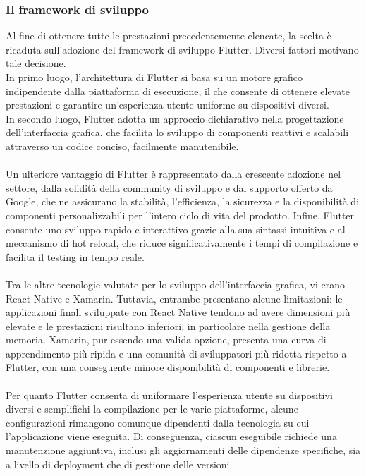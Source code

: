 \subsubsection{Il framework di sviluppo}
Al fine di ottenere tutte le prestazioni precedentemente elencate, la scelta è ricaduta sull’adozione del framework di sviluppo Flutter.
Diversi fattori motivano tale decisione. \\
In primo luogo, l'architettura di Flutter si basa su un motore grafico indipendente dalla piattaforma di esecuzione,
il che consente di ottenere elevate prestazioni e garantire un'esperienza utente uniforme su dispositivi diversi. \\
In secondo luogo, Flutter adotta un approccio dichiarativo nella progettazione dell'interfaccia grafica,
che facilita lo sviluppo di componenti reattivi e scalabili attraverso un codice conciso, facilmente manutenibile.\\
\\
Un ulteriore vantaggio di Flutter è rappresentato dalla crescente adozione nel settore,
dalla solidità della community di sviluppo e dal supporto offerto da Google,
che ne assicurano la stabilità, l'efficienza, la sicurezza e la disponibilità di componenti personalizzabili per l'intero ciclo di vita del prodotto.
Infine, Flutter consente uno sviluppo rapido e interattivo grazie alla sua sintassi intuitiva e al meccanismo di hot reload,
che riduce significativamente i tempi di compilazione e facilita il testing in tempo reale.\\
\\
Tra le altre tecnologie valutate per lo sviluppo dell'interfaccia grafica, vi erano React Native e Xamarin.
Tuttavia, entrambe presentano alcune limitazioni: le applicazioni finali sviluppate con React Native tendono ad avere dimensioni più elevate e le prestazioni risultano inferiori,
in particolare nella gestione della memoria.
Xamarin, pur essendo una valida opzione, presenta una curva di apprendimento più ripida e una comunità di sviluppatori più ridotta rispetto a Flutter,
con una conseguente minore disponibilità di componenti e librerie.\\
\\
Per quanto Flutter consenta di uniformare l'esperienza utente su dispositivi diversi e semplifichi la compilazione per le varie piattaforme,
alcune configurazioni rimangono comunque dipendenti dalla tecnologia su cui l'applicazione viene eseguita.
Di conseguenza, ciascun eseguibile richiede una manutenzione aggiuntiva, inclusi gli aggiornamenti delle dipendenze specifiche,
sia a livello di deployment che di gestione delle versioni.\\
\\

